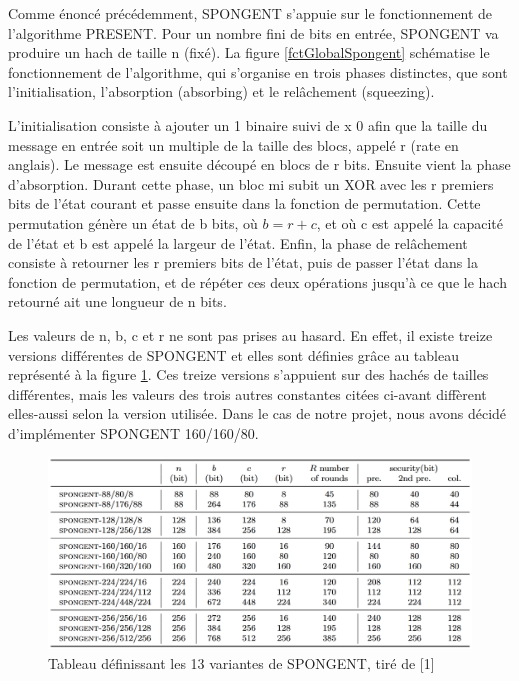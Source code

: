 		Comme énoncé précédemment, SPONGENT s’appuie sur le fonctionnement de l’algorithme PRESENT.
		Pour un nombre fini de bits en entrée, SPONGENT va produire un hach de taille n (fixé).
		La figure \ref{fctGlobalSpongent} schématise le fonctionnement de l’algorithme, qui s’organise en trois phases distinctes, que sont l’initialisation, l’absorption (absorbing) et le relâchement (squeezing).

		L’initialisation consiste à ajouter un 1 binaire suivi de x 0 afin que la taille du message en entrée soit un multiple de la taille des blocs, appelé r (rate en anglais).
		Le message est ensuite découpé en blocs de r bits.
		Ensuite vient la phase d’absorption.
		Durant cette phase, un bloc mi subit un XOR avec les r premiers bits de l’état courant et passe ensuite dans la fonction de permutation.
		Cette permutation génère un état de b bits, où $b = r + c$, et où c est appelé la capacité de l’état et b est appelé la largeur de l’état.
		Enfin, la phase de relâchement consiste à retourner les r premiers bits de l’état, puis de passer l’état dans la fonction de permutation,
		et de répéter ces deux opérations jusqu’à ce que le hach retourné ait une longueur de n bits.

		Les valeurs de n, b, c et r ne sont pas prises au hasard. En effet, il existe treize versions différentes de SPONGENT et elles sont définies grâce au tableau représenté à la figure \ref{variantesSpongent}.
		Ces treize versions s’appuient sur des hachés de tailles différentes, mais les valeurs des trois autres constantes citées ci-avant diffèrent elles-aussi selon la version utilisée.
		Dans le cas de notre projet, nous avons décidé d’implémenter SPONGENT 160/160/80.

		\begin{figure}[h]
			\centering
			\includegraphics[width=\textwidth]{imgs/Spongent/varianteSpongent.png}
			\caption{Tableau définissant  les 13 variantes de SPONGENT, tiré de [1]}
			\label{variantesSpongent}
   		\end{figure}

